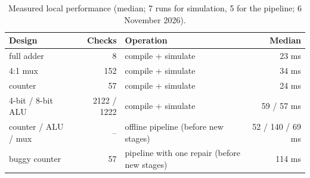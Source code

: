 \begin{table}[H]
\centering
\caption{Measured local performance (median; 7 runs for simulation, 5 for the pipeline; 6 November 2026).}
\label{tab:perf}
\small
\begin{tabular}{@{}l r l r@{}}
\toprule
\textbf{Design} & \textbf{Checks} & \textbf{Operation} & \textbf{Median} \\
\midrule
full adder & 8 & compile + simulate & 23 ms \\
4:1 mux & 152 & compile + simulate & 34 ms \\
counter & 57 & compile + simulate & 24 ms \\
4-bit / 8-bit ALU & 2122 / 1222 & compile + simulate & 59 / 57 ms \\
counter / ALU / mux & -- & offline pipeline (before new stages) & 52 / 140 / 69 ms \\
buggy counter & 57 & pipeline with one repair (before new stages) & 114 ms \\
\bottomrule
\end{tabular}
\end{table}
